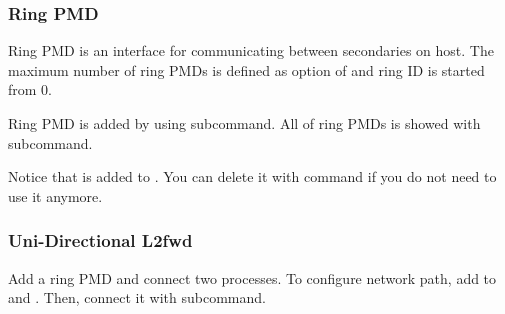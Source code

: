 \documentclass[a4paper,11pt,openany,oneside,english]{sphinxmanual}
\begin{document}
\subsubsection{Ring PMD}
\label{\detokenize{usecases/spp_nfv:ring-pmd}}
Ring PMD is an interface for communicating between secondaries on host.
The maximum number of ring PMDs is defined as   option of
 and ring ID is started from 0.

Ring PMD is added by using  subcommand.
All of ring PMDs is showed with  subcommand.

\begin{sphinxVerbatim}[commandchars=\\\{\},formatcom=\footnotesize]
\end{sphinxVerbatim}

Notice that  is added to .
You can delete it with  command if you do not need to
use it anymore.

\begin{sphinxVerbatim}[commandchars=\\\{\},formatcom=\footnotesize]
\end{sphinxVerbatim}


\subsubsection{Uni-Directional L2fwd}
\label{\detokenize{usecases/spp_nfv:uni-directional-l2fwd}}
Add a ring PMD and connect two  processes.
To configure network path, add  to  and .
Then, connect it with  subcommand.
\end{document}
